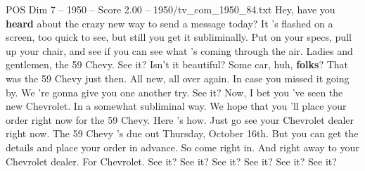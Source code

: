 \begin{textsample}{POS Dim 7 – 1950 – Score 2.00 – 1950/tv\_com\_1950\_84.txt}  \label{ex:f7_pos_016}
Hey, have you \textbf{heard} about the crazy new way to send a message today?
It 's flashed on a screen, too quick to see, but still you get it subliminally.
Put on your specs, pull up your chair, and see if you can see what 's coming through the air.
Ladies and gentlemen, the 59 Chevy.
See it?
Isn't it beautiful?
Some car, huh, \textbf{folks}?
That was the 59 Chevy just then.
All new, all over again.
In case you missed it going by.
We 're gonna give you one another try.
See it?
Now, I bet you 've seen the new Chevrolet.
In a somewhat subliminal way.
We hope that you 'll place your order right now for the 59 Chevy.
Here 's how.
Just go see your Chevrolet dealer right now.
The 59 Chevy 's due out Thursday, October 16th.
But you can get the details and place your order in advance.
So come right in.
And right away to your Chevrolet dealer.
For Chevrolet.
See it?
See it?
See it?
See it?
See it?
See it?

\end{textsample}
